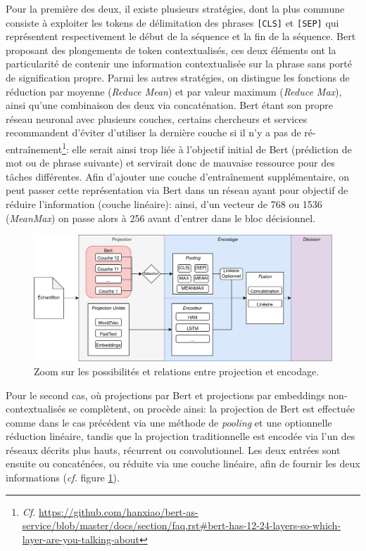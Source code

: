Pour la première des deux, il existe plusieurs stratégies, dont la plus commune consiste à exploiter les tokens de délimitation des phrases \texttt{[CLS]} et \texttt{[SEP]} qui représentent respectivement le début de la séquence et la fin de la séquence. Bert proposant des plongements de token contextualisés, ces deux éléments ont la particularité de contenir une information contextualisée sur la phrase sans porté de signification propre. Parmi les autres stratégies, on distingue les fonctions de réduction par moyenne (\textit{Reduce Mean}) et par valeur maximum (\textit{Reduce Max}), ainsi qu'une combinaison des deux via concaténation. Bert étant son propre réseau neuronal avec plusieurs couches, certains chercheurs et services recommandent d'éviter d'utiliser la dernière couche si il n'y a pas de ré-entraînement\footnote{\textit{Cf.} \url{https://github.com/hanxiao/bert-as-service/blob/master/docs/section/faq.rst\#bert-has-12-24-layers-so-which-layer-are-you-talking-about}}: elle serait ainsi trop liée à l'objectif initial de Bert (prédiction de mot ou de phrase suivante) et servirait donc de mauvaise ressource pour des tâches différentes. Afin d'ajouter une couche d'entraînement supplémentaire, on peut passer cette représentation via Bert dans un réseau ayant pour objectif de réduire l'information (couche linéaire): ainsi, d'un vecteur de 768 ou 1536 (\textit{MeanMax}) on passe alors à 256 avant d'entrer dans le bloc décisionnel.

\begin{figure}[ht]
    \centering
    \includegraphics[width=\linewidth]{figures/chap4/BertZoom.png}
    \caption{Zoom sur les possibilités et relations entre projection et encodage.}
    \label{fig:chap4:zoom-projection}
\end{figure}

Pour le second cas, où projections par Bert et projections par embeddings non-contextualisés se complètent, on procède ainsi: la projection de Bert est effectuée comme dans le cas précédent via une méthode de \textit{pooling} et une optionnelle réduction linéaire, tandis que la projection traditionnelle est encodée via l'un des réseaux décrits plus hauts, récurrent ou convolutionnel. Les deux entrées sont ensuite ou concaténées, ou réduite via une couche linéaire, afin de fournir les deux informations (\textit{cf.} figure \ref{fig:chap4:zoom-projection}).

